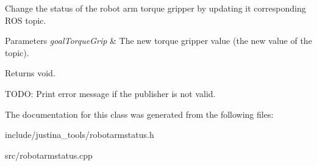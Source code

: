 Change the status of the robot arm torque gripper by updating it corresponding R\+OS topic. 


\begin{DoxyParams}{Parameters}
{\em goal\+Torque\+Grip} & The new torque gripper value (the new value of the topic). \\
\hline
\end{DoxyParams}
\begin{DoxyReturn}{Returns}
void. 
\end{DoxyReturn}
T\+O\+DO\+: Print error message if the publisher is not valid.

The documentation for this class was generated from the following files\+:\begin{DoxyCompactItemize}
\item 
include/justina\+\_\+tools/robotarmstatus.\+h\item 
src/robotarmstatus.\+cpp\end{DoxyCompactItemize}
